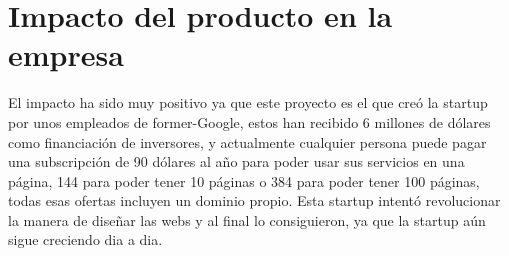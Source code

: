 \section{Impacto del producto en la empresa}
El impacto ha sido muy positivo ya que este proyecto es el que creó la startup por unos empleados de former-Google, estos han recibido 6 millones de dólares como financiación de inversores, y actualmente cualquier persona puede pagar una subscripción de 90 dólares al año para poder usar sus servicios en una página, 144 para poder tener 10 páginas o 384 para poder tener 100 páginas, todas esas ofertas incluyen un dominio propio.
Esta startup intentó revolucionar la manera de diseñar las webs y al final lo consiguieron, ya que la startup aún sigue creciendo dia a dia.
